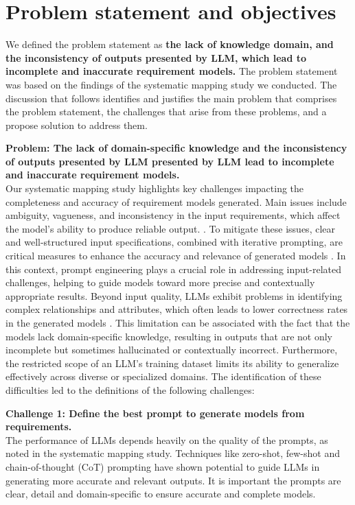 \section{Problem statement and objectives}
\label{sec:problem_statement_and_objectives}

We defined the problem statement as \textbf{the lack of knowledge domain, and the inconsistency of outputs presented by LLM, which lead to incomplete and inaccurate requirement models.} 
The problem statement was based on the findings of the systematic mapping study we conducted. The discussion that follows identifies and justifies the main problem that comprises the problem statement, the challenges that arise from these problems, and a propose solution to address them. 

\vspace{1.5 em}
\textbf{Problem: The lack of domain-specific knowledge and the inconsistency of outputs presented by LLM presented by LLM lead to incomplete and inaccurate requirement models.}\\
Our systematic mapping study highlights key challenges impacting the completeness and accuracy of requirement models generated. Main issues include ambiguity, vagueness, and inconsistency in the input requirements, which affect the model’s ability to produce reliable output. \cite{11omar2023}. To mitigate these issues, clear and well-structured input specifications, combined with iterative prompting, are critical measures to enhance the accuracy and relevance of generated models \cite{5ferrari2024}. In this context, prompt engineering plays a crucial role in addressing input-related challenges, helping to guide models toward more precise and contextually appropriate results.
Beyond input quality, LLMs exhibit problems in identifying complex relationships and attributes, which often leads to lower correctness rates in the generated models \cite{6wang2024}. This limitation can be associated with the fact that the models lack domain-specific knowledge, resulting in outputs that are not only incomplete but sometimes hallucinated or contextually incorrect. Furthermore, the restricted scope of an LLM’s training dataset limits its ability to generalize effectively across diverse or specialized domains. The identification of these difficulties led to the definitions of the following challenges:

\vspace{1.5 em}
\textbf{Challenge 1: Define the best prompt to generate models from requirements.}\\
The performance of LLMs depends heavily on the quality of the prompts, as noted in the systematic mapping study. Techniques like zero-shot, few-shot and chain-of-thought (CoT) prompting have shown potential to guide LLMs in generating more accurate and relevant outputs. 
It is important the prompts are clear, detail and domain-specific to ensure accurate and complete models. 

